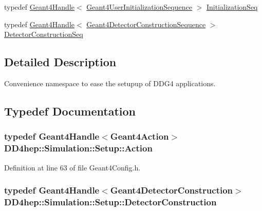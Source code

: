 \begin{DoxyCompactItemize}
\item 
typedef \hyperlink{class_d_d4hep_1_1_simulation_1_1_geant4_handle}{Geant4Handle}$<$ \hyperlink{class_d_d4hep_1_1_simulation_1_1_geant4_user_initialization_sequence}{Geant4UserInitializationSequence} $>$ \hyperlink{namespace_d_d4hep_1_1_simulation_1_1_setup_a37cbef7433b99bf178ae539e3696477d}{InitializationSeq}
\item 
typedef \hyperlink{class_d_d4hep_1_1_simulation_1_1_geant4_handle}{Geant4Handle}$<$ \hyperlink{class_d_d4hep_1_1_simulation_1_1_geant4_detector_construction_sequence}{Geant4DetectorConstructionSequence} $>$ \hyperlink{namespace_d_d4hep_1_1_simulation_1_1_setup_a66188950ce6f5c228993102224d2552a}{DetectorConstructionSeq}
\end{DoxyCompactItemize}


\subsection{Detailed Description}
Convenience namespace to ease the setupup of DDG4 applications. 

\subsection{Typedef Documentation}
\hypertarget{namespace_d_d4hep_1_1_simulation_1_1_setup_aa958972310161bf099d9d22e59d257ab}{
\subsubsection[{Action}]{\setlength{\rightskip}{0pt plus 5cm}typedef {\bf Geant4Handle}$<${\bf Geant4Action}$>$ {\bf DD4hep::Simulation::Setup::Action}}}
\label{namespace_d_d4hep_1_1_simulation_1_1_setup_aa958972310161bf099d9d22e59d257ab}


Definition at line 63 of file Geant4Config.h.\hypertarget{namespace_d_d4hep_1_1_simulation_1_1_setup_a8405db8ef232c0fb524d029682e94005}{
\subsubsection[{DetectorConstruction}]{\setlength{\rightskip}{0pt plus 5cm}typedef {\bf Geant4Handle}$<${\bf Geant4DetectorConstruction}$>$ {\bf DD4hep::Simulation::Setup::DetectorConstruction}}}
\label{namespace_d_d4hep_1_1_simulation_1_1_setup_a8405db8ef232c0fb524d029682e94005}


